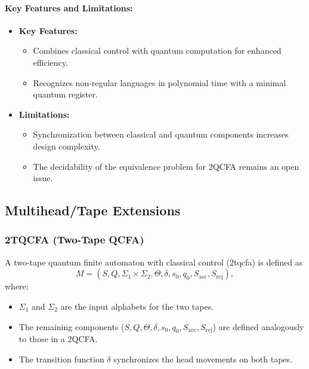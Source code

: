 \paragraph{Key Features and Limitations:}
\begin{itemize}
    \item \textbf{Key Features:}
    \begin{itemize}
        \item Combines classical control with quantum computation for enhanced efficiency.
        \item Recognizes non-regular languages in polynomial time with a minimal quantum register.
    \end{itemize}
    \item \textbf{Limitations:}
    \begin{itemize}
        \item Synchronization between classical and quantum components increases design complexity.
        \item The decidability of the equivalence problem for 2QCFA remains an open issue.
    \end{itemize}
\end{itemize}

\subsection{Multihead/Tape Extensions}
\label{subsec:multihead-tape}

\subsubsection{2TQCFA (Two-Tape QCFA)}
\label{sssec:2tqcfa}
\begin{definition}[2TQCFA]
A two-tape quantum finite automaton with classical control (\gls{2tqcfa}) is defined as 
\[
M = (S, Q, \Sigma_1 \times \Sigma_2, \Theta, \delta, s_0, q_0, S_{\text{acc}}, S_{\text{rej}}),
\]
where:
\begin{itemize}
    \item \( \Sigma_1 \) and \( \Sigma_2 \) are the input alphabets for the two tapes.
    \item The remaining components (\( S, Q, \Theta, \delta, s_0, q_0, S_{\text{acc}}, S_{\text{rej}} \)) are defined analogously to those in a 2QCFA.
    \item The transition function \(\delta\) synchronizes the head movements on both tapes.
\end{itemize}
\end{definition}

